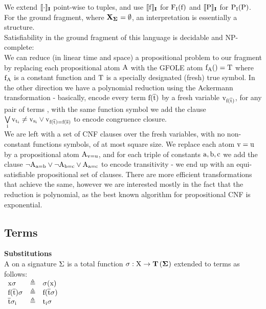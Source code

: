 \noindent
We extend  $\llbracket \mathrm{\cdot} \rrbracket_{\mathbf{I}}$ point-wise to tuples, and use $\llbracket \mathrm{f} \rrbracket_{\mathbf{I}}$ for $\mathrm{\mathrm{F_I}(f)}$ and $\llbracket \mathrm{P} \rrbracket_{\mathbf{I}}$ for $\mathrm{\mathrm{P_I}(P)}$.\\
For the ground fragment, where $\Vs{\sig}=\emptyset$, an interpretation is essentially a structure.\\
Satisfiability in the ground fragment of this language is decidable and NP-complete:\\
We can reduce (in linear time and space) a propositional problem to our fragment by replacing each propositional atom $\mathrm{A}$ with the GFOLE atom $\mathrm{f_A()=T}$ where $\mathrm{f_A}$ is a constant function and $\mathrm{T}$ is a specially designated (fresh) true symbol.
In the other direction we have a polynomial reduction using the Ackermann transformation - basically, encode every term $\mathrm{f}(\mathrm{\overline{t}})$ by a fresh variable  $\mathrm{v_{\mathrm{f}(\mathrm{\overline{t}})}}$, for any pair of terms ,  with the same function symbol we add the clause
$ \bigvee\limits_{\mathrm{i}} \mathrm{\mathrm{v}_{t_i} \neq \mathrm{v}_{s_i}} \lor \mathrm{v}_{\mathrm{f}(\mathrm{\overline{t}})=\mathrm{f}(\mathrm{\overline{s}})}$ to encode congruence closure.\\
We are left with a set of CNF clauses over the fresh variables, with no non-constant functions symbols, of at most square size.
We replace each atom $\mathrm{v=u}$ by a propositional atom $\mathrm{A_{v=u}}$, and for each triple of constants $\mathrm{a,b,c}$ we add the clause 
$\mathrm{\lnot A_{a=b} \lor \lnot A_{b=c} \lor A_{a=c}}$ to encode transitivity - we end up with an equi-satisfiable propositional set of clauses.
There are more efficient transformations that achieve the same, however we are interested mostly in the fact that the reduction is polynomial, as the best known algorithm for propositional CNF is exponential.


\subsection*{Terms}
\bigskip

\noindent
\textbf{Substitutions}\\
A  on a signature $\mathrm{\Sigma}$ is a total function $\m{\sigma : \m{X} \rightarrow \Ts{\sig}}$ extended to terms as follows:\\
$
\begin{array}{lll}
\mathrm{x\sigma}         & \triangleq & \mathrm{\sigma(x)}\\
\mathrm{\mathrm{f}(\mathrm{\overline{t}})\sigma} & \triangleq & \mathrm{f(\mathrm{\overline{t}}\sigma)}\\
\mathrm{\mathrm{\overline{t}}\sigma_i} & \triangleq & \mathrm{t_i\sigma}\\
\end{array}
$

